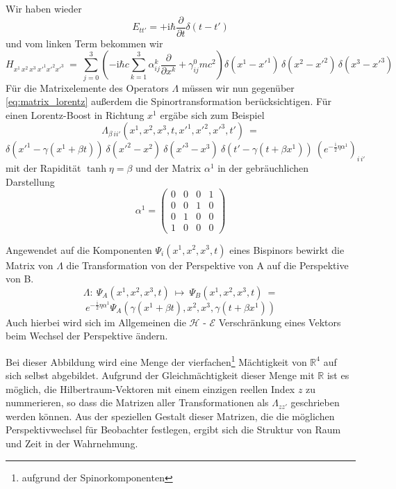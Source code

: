 \documentclass[12pt]{article}
\begin{document}
Wir haben wieder
\begin{equation*}
E_{tt'} = +\mathrm {i} \hbar \frac{\partial }{\partial t}\delta(t-t')
\end{equation*} 
und vom linken Term bekommen wir
\begin{equation*}
H_{x^1\,x^2\,x^3\ {x'}^1{x'}^2{x'}^3}\ =\ 
\sum_{j=0}^{3}\left(-\mathrm{i}\hbar c \sum_{k=1}^{3}\alpha^{k}_{ij}\frac{\partial }{\partial x^k}+\gamma^{0}_{ij} m c^2 \right) 
\delta(x^1-{x'}^1)\,\delta(x^2-{x'}^2)\,\delta(x^3-{x'}^3)
\end{equation*} 
Für die Matrixelemente des Operators $\Lambda$ müssen wir nun gegenüber \eqref{eq:matrix_lorentz} außerdem die Spinortransformation berücksichtigen. Für einen Lorentz-Boost in Richtung $x^1$ ergäbe sich zum Beispiel
\begin{equation*}
\Lambda_{\beta\ ii'}(x^1,x^2,x^3,t,{x'}^1,{x'}^2,{x'}^3,t')\ =
\end{equation*}
\begin{equation*}
\delta({x'}^1-\gamma(x^1+\beta t))\ 
\delta({x'}^2-x^2)\ 
\delta({x'}^3-x^3)\ 
\delta(t'-\gamma(t+\beta x^1))\ 
\left( e^{-\frac{\mathrm{i}}{2}\eta\alpha^1} \right)_{i\,i'}
\end{equation*}
mit der Rapidität $\tanh \eta = \beta$ und der Matrix $\alpha^1$ in der gebräuchlichen Darstellung
\begin{equation*}
\alpha^1 = \begin{pmatrix}
0 & 0 & 0 & 1 \\
0 & 0 & 1 & 0 \\
0 & 1 & 0 & 0 \\
1 & 0 & 0 & 0 
\end{pmatrix}
\end{equation*}

Angewendet auf die Komponenten $\Psi_i(x^1,x^2,x^3,t)$ eines Bispinors bewirkt die Matrix von $\Lambda$ die Transformation von der Perspektive von A auf die Perspektive von B.
\begin{equation*}
\Lambda:\ \Psi_A(x^1,x^2,x^3,t)\ \mapsto\ \Psi_B(x^1,x^2,x^3,t)\ =
\end{equation*}
\begin{equation*}
e^{-\frac{\mathrm{i}}{2}\eta\alpha^1} \Psi_{A}\left(\gamma(x^1+\beta t),x^2,x^3,\gamma(t+\beta x^1)\right)
\end{equation*}
Auch hierbei wird sich im Allgemeinen die $\mathscr{H}$ - $\mathscr{E}$ Verschränkung eines Vektors beim Wechsel der Perspektive ändern.

Bei dieser Abbildung wird eine Menge der vierfachen\footnote{aufgrund der Spinorkomponenten} Mächtigkeit von $\mathbb{R}^4$ auf sich selbst abgebildet. Aufgrund der Gleichmächtigkeit dieser Menge mit $\mathbb{R}$ ist es möglich, die Hilbertraum-Vektoren mit einem einzigen reellen Index $z$ zu nummerieren, so dass die Matrizen aller Transformationen als $\Lambda_{zz'}$ geschrieben werden können. Aus der speziellen Gestalt dieser Matrizen, die die möglichen Perspektivwechsel für Beobachter festlegen, ergibt sich die Struktur von Raum und Zeit in der Wahrnehmung.
\end{document}
